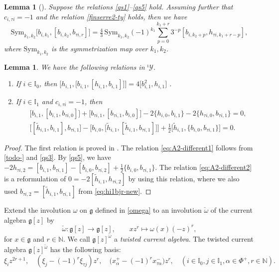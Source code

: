 \documentclass[11pt,reqno]{amsart}
\numberwithin{equation}{section}
\newtheorem{lem}[thm]{Lemma}
\theoremstyle{definition}
\theoremstyle{remark}
\newcommand{\beq}{\begin{equation}}
\newcommand{\eeq}{\end{equation}}
\newcommand{\bN}{\mathbb{N}}
\newcommand{\hf}{\tfrac12}
\newcommand{\g}{\mathfrak{g}}
\newcommand{\tl}{\tilde}
\newcommand{\I}{{\mathbb I}}
\newcommand{\Yi}{{^\imath\mathscr{Y}}}
\begin{document}
\begin{lem}[{\cite[Proposition~3.12]{LZ24}}]
Suppose the relations \eqref{qs1}--\eqref{qs5} hold. Assuming further that $c_{i,\tau i}=-1$ and the relation \eqref{finserre2-ty} holds, then we have
\beq\label{todo-}
\mathrm{Sym}_{k_1,k_2}\big[b_{i,k_1},[b_{i,k_2},b_{\tau i,r}] \big] =\tfrac{4}{3}\,\mathrm{Sym}_{k_1,k_2}(-1)^{k_1}\sum_{p=0}^{k_1+r}3^{-p}[b_{i,k_2+p},h_{\tau i,k_1+r-p}],
\eeq
where $\mathrm{Sym}_{k_1,k_2}$ is the symmetrization map over $k_1,k_2$.
\end{lem}

\begin{lem}\label{lem:hbhb}
We have the following relations in $\Yi$.
\begin{enumerate}
    \item If $i\in \I_0$, then  $\big[h_{i,1},\big[b_{i,1},[h_{i,1},b_{i,1}]\big]\big]=4\big[b_{i,1}^2,h_{i,1}\big]$ .
\item If $i\in \I_1$ and $c_{i,\tau i}=-1$, then 
\begin{align}
&\big[b_{i,1},[b_{i,1},b_{\tau i,0}]\big]
+
\big[b_{\tau i,1},[b_{\tau i,1},b_{i,0}]\big]-2\{h_{i,0},b_{i,1}\}-2\{h_{\tau i,0},b_{\tau i,1}\}
=0,\label{eq:A2-different1}\\
&\big[[\tl h_{i,1},b_{i,1}],b_{\tau i,1}\big]-\big[b_{i,0},\big[\tl h_{i,1},[\tl h_{i,1},b_{\tau i,1}]\big]\big]+\hf\big[\tl h_{i,1},\{b_{i,0},b_{\tau i,1}\}\big]=0.\label{eq:A2-different2}
\end{align}
\end{enumerate}
\end{lem}
\begin{proof}
The first relation is proved in \cite[Lemma~2.9]{Lu26min}. 
The relation \eqref{eq:A2-different1} follows from \eqref{todo-} and \eqref{qs3}. By \eqref{qs5}, we have $-2h_{\tau i,2}=[b_{i,1 },b_{\tau i,1}]  - [b_{i,0 },b_{\tau i,2 }] 
 +\tfrac{1}{2}\{b_{i,0 },b_{\tau i,1 }\}$. The relation \eqref{eq:A2-different2} is a reformulation of $0=-2[\tl h_{i,1},h_{\tau i,2}]$ by using this relation, where we also used $b_{\tau i,2 }=[\tl h_{i,1},b_{\tau i,1}]$ from \eqref{eq:hi1bjr-new}.
\end{proof}


Extend the involution $\omega$ on $\g$ defined in \eqref{omega} to an involution $\check\omega $ of the current algebra $\g[z]$ by
\[
\check\omega: \g[z]\to \g[z],\qquad xz^r\mapsto \omega(x)(-z)^r,
\]
for $x\in \g$ and $r\in\bN$. We call $\g[z]^{\check\omega}$ a \textit{twisted current algebra}. The twisted current algebra $\g[z]^{\check\omega}$ has the following basis:
\[
\xi_iz^{2r+1},\quad (\xi_{j}-(-1)^r \xi_{\tau j})z^r,\quad \big(x_\alpha^+-(-1)^rx_{\tau \alpha}^-\big)z^r,\quad (i\in\I_0,j\in \I_1,\alpha\in\Phi^+,r\in\bN).
\]
\end{document}
